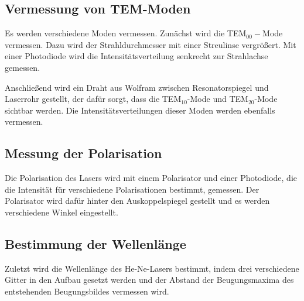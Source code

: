\subsection{Vermessung von TEM-Moden}
Es werden verschiedene Moden vermessen. Zunächst wird die TEM$_{00}-$Mode vermessen. Dazu wird der Strahldurchmesser mit einer Streulinse vergrößert. Mit einer Photodiode wird die Intensitätsverteilung senkrecht zur Strahlachse gemessen.

Anschließend wird ein Draht aus Wolfram zwischen Resonatorspiegel und Laserrohr gestellt, der dafür sorgt, dass die TEM$_{10}$-Mode und TEM$_{20}$-Mode sichtbar werden. Die Intensitätsverteilungen dieser Moden werden ebenfalls vermessen.


\subsection{Messung der Polarisation}
Die Polarisation des Lasers wird mit einem Polarisator und einer Photodiode, die die Intensität für verschiedene Polarisationen bestimmt, gemessen.
Der Polarisator wird dafür hinter den Auskoppelspiegel gestellt und es werden verschiedene Winkel eingestellt.


\subsection{Bestimmung der Wellenlänge}
Zuletzt wird die Wellenlänge des He-Ne-Lasers bestimmt, indem drei verschiedene Gitter in den Aufbau gesetzt werden und der Abstand der Beugungsmaxima des entstehenden Beugungsbildes vermessen wird.